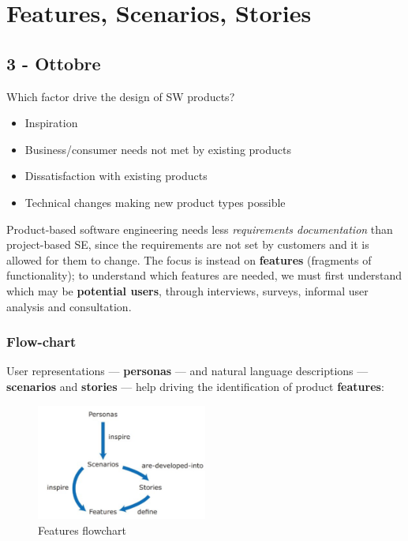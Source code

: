 \chapter{Features, Scenarios, Stories}

\section{3 - Ottobre}
Which factor drive the design of SW products?
\begin{itemize}
    \item {\color{gray}Inspiration}
    \item Business/consumer needs not met by existing products
    \item Dissatisfaction with existing products
    \item Technical changes making new product types possible
\end{itemize}

Product-based software engineering needs less \textit{requirements documentation} than project-based SE, 
since the requirements are not set by customers and it is allowed for them to change.
The focus is instead on \textbf{features} (fragments of functionality); 
to understand which features are needed, we must first understand which may be \textbf{potential users}, through interviews, surveys, informal user analysis and consultation.

\subsection*{Flow-chart}
User representations {---} \textbf{personas} {---} and natural language descriptions {---} \textbf{scenarios} and \textbf{stories} {---} help driving the identification of product \textbf{features}:
\begin{figure}[h]
    \centering
    \includegraphics[width=0.5\textwidth]{images/features_flow.png}
    \caption{Features flowchart}
    \label{fig:features_flowchart}
\end{figure}

